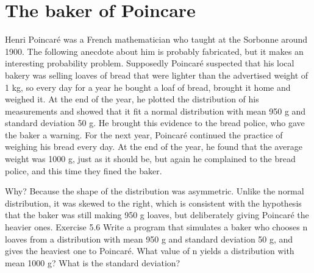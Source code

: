 \documentclass[a4paper]{article}
\begin{document}
\section{The baker of Poincare}
\label{sec:org94bc890}


Henri Poincaré was a French mathematician who taught at the Sorbonne around 1900. The following anecdote about him is probably fabricated, but it makes an interesting probability problem.
Supposedly Poincaré suspected that his local bakery was selling loaves of bread that were lighter than the advertised weight of 1 kg, so every day for a year he bought a loaf of bread, brought it home and weighed it. At the end of the year, he plotted the distribution of his measurements and showed that it fit a normal distribution with mean 950 g and standard deviation 50 g. He brought this evidence to the bread police, who gave the baker a warning.
For the next year, Poincaré continued the practice of weighing his bread every day. At the end of the year, he found that the average weight was 1000 g, just as it should be, but again he complained to the bread police, and this time they fined the baker.


Why? Because the shape of the distribution was asymmetric. Unlike the normal distribution, it was skewed to the right, which is consistent with the hypothesis that the baker was still making 950 g loaves, but deliberately giving Poincaré the heavier ones.
Exercise 5.6 Write a program that simulates a baker who chooses n loaves from a distribution with mean 950 g and standard deviation 50 g, and gives the heaviest one to Poincaré. What value of n yields a distribution with mean 1000 g? What is the standard deviation?
\end{document}
